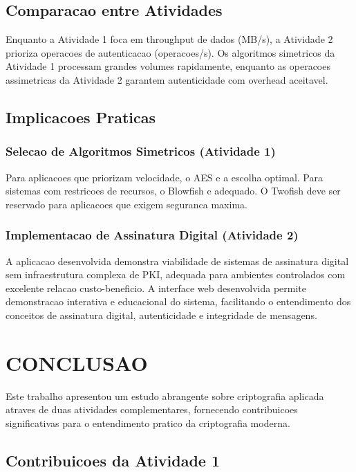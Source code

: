 \documentclass[12pt,a4paper,oneside]{article}
\begin{document}
\subsection{Comparacao entre Atividades}

Enquanto a Atividade 1 foca em throughput de dados (MB/s), a Atividade 2 prioriza operacoes de autenticacao (operacoes/s). Os algoritmos simetricos da Atividade 1 processam grandes volumes rapidamente, enquanto as operacoes assimetricas da Atividade 2 garantem autenticidade com overhead aceitavel.

\subsection{Implicacoes Praticas}

\subsubsection{Selecao de Algoritmos Simetricos (Atividade 1)}

Para aplicacoes que priorizam velocidade, o AES e a escolha optimal. Para sistemas com restricoes de recursos, o Blowfish e adequado. O Twofish deve ser reservado para aplicacoes que exigem seguranca maxima.

\subsubsection{Implementacao de Assinatura Digital (Atividade 2)}

A aplicacao desenvolvida demonstra viabilidade de sistemas de assinatura digital sem infraestrutura complexa de PKI, adequada para ambientes controlados com excelente relacao custo-beneficio. A interface web desenvolvida permite demonstracao interativa e educacional do sistema, facilitando o entendimento dos conceitos de assinatura digital, autenticidade e integridade de mensagens.

\section{CONCLUSAO}

Este trabalho apresentou um estudo abrangente sobre criptografia aplicada atraves de duas atividades complementares, fornecendo contribuicoes significativas para o entendimento pratico da criptografia moderna.

\subsection{Contribuicoes da Atividade 1}
\end{document}
